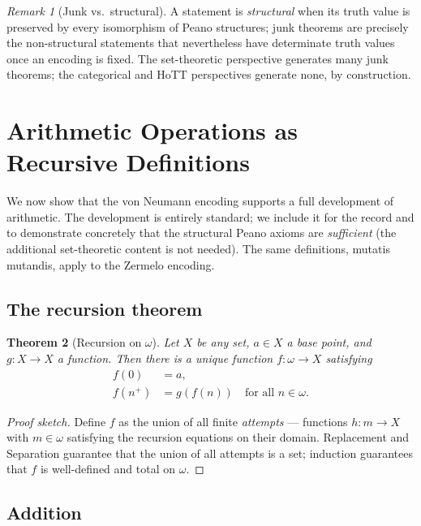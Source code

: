 \documentclass[12pt]{article}
\newtheorem{theorem}{Theorem}[section]
\theoremstyle{definition}
\theoremstyle{remark}
\newtheorem{remark}[theorem]{Remark}
\begin{document}
\begin{remark}[Junk vs.\ structural]
A statement is \emph{structural} when its truth value is preserved by every
isomorphism of Peano structures; junk theorems are precisely the
non-structural statements that nevertheless have determinate truth values
once an encoding is fixed. The set-theoretic perspective generates many
junk theorems; the categorical and HoTT perspectives generate none, by
construction.
\end{remark}

\section{Arithmetic Operations as Recursive Definitions}
\label{sec:operations}

We now show that the von Neumann encoding supports a full development of
arithmetic. The development is entirely standard; we include it for the
record and to demonstrate concretely that the structural Peano axioms are
\emph{sufficient} (the additional set-theoretic content is not needed).
The same definitions, mutatis mutandis, apply to the Zermelo encoding.

\subsection{The recursion theorem}

\begin{theorem}[Recursion on $\omega$]\label{thm:recursion}
Let $X$ be any set, $a \in X$ a base point, and $g: X \to X$ a function.
Then there is a unique function $f: \omega \to X$ satisfying
\begin{align}
f(0) &= a, \\
f(n^+) &= g(f(n)) \quad \text{for all } n \in \omega.
\end{align}
\end{theorem}

\begin{proof}[Proof sketch]
Define $f$ as the union of all finite \emph{attempts} --- functions
$h: m \to X$ with $m \in \omega$ satisfying the recursion equations on
their domain. Replacement and Separation guarantee that the union of all
attempts is a set; induction guarantees that $f$ is well-defined and
total on $\omega$.
\end{proof}

\subsection{Addition}
\end{document}
